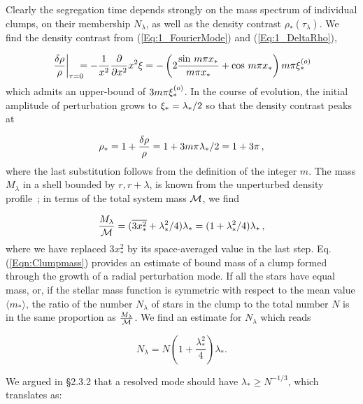 Clearly the segregation time depends strongly on the mass spectrum of individual clumps, on their membership $N_\lambda$, as well as the density contrast $\rho_\ast(\tau_\lambda)$. We find the density contrast from (\ref{Eq:1_FourierMode}) and (\ref{Eq:1_DeltaRho}),  

\[ \left.\frac{\delta\rho}{\rho}\right|_{\tau=0} \!\!\!\! = - \frac{1}{x^2}\frac{\partial}{\partial x^2} x^2\xi = - \left( 2 \frac{\sin\, m\pi x_\ast }{m\pi x_\ast} + \cos\,m\pi x_\ast \right) m\pi   \xi_\ast^{(o)}
\]
which admits an upper-bound of $3 m\pi \xi_\ast^{(o)}$. In the course of evolution, the initial amplitude of perturbation grows to $\xi_\ast = \lambda_\ast/2$ so that the density contrast peaks at 

\begin{equation} \label{Eqn:Densitypeak} 
  \rho_\ast = 1 + \frac{\delta\rho}{\rho} = 1 + 3 m\pi \lambda_\ast / 2 = 1 + 3\pi\, ,
\end{equation}
where the last substitution follows from the definition of the integer $m$. The mass $M_\lambda$ in a shell bounded by $r, r+ \lambda$, is known from the unperturbed density profile~; in terms of the total system mass ${\cal M}$, we find 

\begin{equation} \label{Eqn:Clumpmass} 
   \frac{M_\lambda}{{\cal M} } = ( \overline{3 x_\ast^2} + \lambda_\ast^2/4 ) \lambda_\ast = ( 1 + \lambda_\ast^2/4) \lambda_\ast \, , 
\end{equation}
where we have replaced $3x_\ast^2$ by its space-averaged value in  the last step.  Eq. (\ref{Eqn:Clumpmass}) provides an estimate of  bound mass of a clump formed through the growth of a radial perturbation mode. If all the stars have equal mass, or, if the stellar mass function is symmetric with respect to the mean value $\langle m_\ast\rangle$, the ratio of the number $N_\lambda$ of stars in the clump to the total number $N$ is in the same proportion as $\frac{M_\lambda}{\cal M}$. We find an estimate for $N_\lambda$ which reads 

\begin{equation} \label{Eqn:Clumpn} 
   N_\lambda = N \left( 1 + \frac{\lambda_\ast^2}{4} \right) \lambda_* .
\end{equation} 

We argued in \S2.3.2 that a resolved mode should have $\lambda_\ast \ge N^{-1/3}$, which translates as: 

